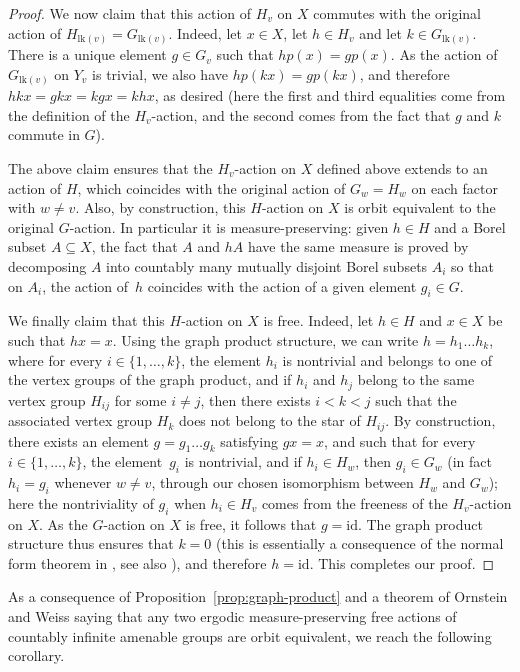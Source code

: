 \documentclass[11pt]{article}
\numberwithin{equation}{section}
\theoremstyle{plain}
\theoremstyle{definition}
\newcommand{\lk}{\mathrm{lk}}
\begin{document}
\begin{proof}
We now claim that this action of $H_v$ on $X$ commutes with the original action of $H_{\lk(v)}=G_{\lk(v)}$. Indeed, let $x\in X$, let $h\in H_v$ and let $k\in G_{\lk(v)}$. There is a unique element $g\in G_v$ such that $hp(x)=gp(x)$. As the action of $G_{\lk(v)}$ on $Y_v$ is trivial, we also have $hp(kx)=gp(kx)$, and therefore $hkx=gkx=kgx=khx$, as desired (here the first and third equalities come from the definition of the $H_v$-action, and the second comes from the fact that $g$ and $k$ commute in $G$).

The above claim ensures that the $H_v$-action on $X$ defined above extends to an action of $H$, which coincides with the original action of $G_w=H_w$ on each factor with $w\neq v$. Also, by construction, this $H$-action on $X$ is orbit equivalent to the original $G$-action. In particular it is measure-preserving: given $h\in H$ and a Borel subset $A\subseteq X$, the fact that $A$ and $hA$ have the same measure is proved by decomposing $A$ into countably many mutually disjoint Borel subsets $A_i$ so that on $A_i$, the action of~$h$ coincides with the action of a given element $g_i\in G$.

We finally claim that this $H$-action on $X$ is free. Indeed, let $h\in H$ and $x\in X$ be such that $hx=x$. Using the graph product structure, we can write $h=h_1\dots h_k$, where for every $i\in\{1,\dots,k\}$, the element $h_i$ is nontrivial and belongs to one of the vertex groups of the graph product, and if $h_i$ and $h_j$ belong to the same vertex group $H_{ij}$ for some $i\neq j$, then there exists $i<k<j$ such that the associated vertex group $H_k$ does not belong to the star of $H_{ij}$. By construction, there exists an element $g=g_1\dots g_k$ satisfying $gx=x$, and such that for every $i\in\{1,\dots,k\}$, the element~$g_i$ is nontrivial, and if $h_i\in H_w$, then $g_i\in G_w$ (in fact $h_i=g_i$ whenever $w\neq v$, through our chosen isomorphism between $H_w$ and $G_w$); here the nontriviality of $g_i$ when $h_i\in H_v$ comes from the freeness of the $H_v$-action on $X$. As the $G$-action on $X$ is free, it follows that $g=\mathrm{id}$. The graph product structure thus ensures that $k=0$ (this is essentially a consequence of the normal form theorem in \cite{green1990graph}, see also \cite[\S 3]{hermiller1995algorithms}), and therefore $h=\mathrm{id}$. This completes our proof.
\end{proof}

As a consequence of Proposition~\ref{prop:graph-product} and a theorem of Ornstein and Weiss \cite{OW} saying that any two ergodic measure-preserving free actions of countably infinite amenable groups are orbit equivalent, we reach the following corollary.
\end{document}
